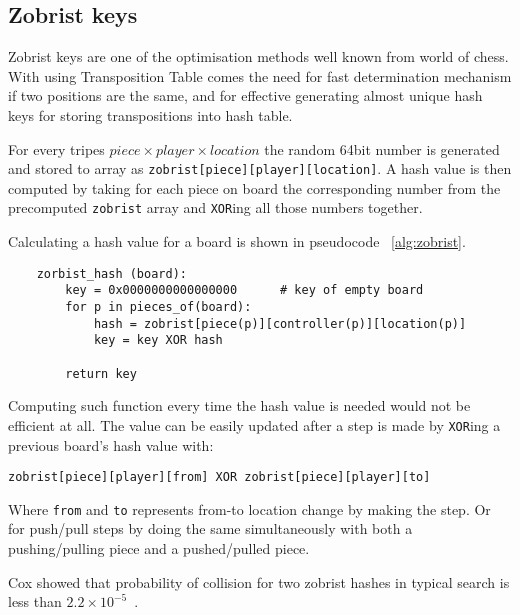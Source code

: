 	\subsection{Zobrist keys}
	Zobrist keys are one of the optimisation methods well known from world of
	chess. With using Transposition Table comes the need for fast determination
	mechanism if two positions are the same, and for effective generating
	almost unique hash keys for storing transpositions into hash table.
	
	For every tripes $piece\times player\times location$ the random 64bit
	number is generated and stored to array as
	\texttt{zobrist[piece][player][location]}. A hash value is then computed by
	taking for each piece on board the corresponding number from the
	precomputed \texttt{zobrist} array and \texttt{XOR}ing all those numbers
	together.

	Calculating a hash value for a board is shown in pseudocode
	~\ref{alg:zobrist}.

	\lstset{language=Python, caption=Computing hash value from zobrist keys, label=alg:zobrist}
	\begin{lstlisting}
    zorbist_hash (board):
        key = 0x0000000000000000      # key of empty board
        for p in pieces_of(board):
            hash = zobrist[piece(p)][controller(p)][location(p)]
            key = key XOR hash

        return key
    \end{lstlisting}

	Computing such function every time the hash value is needed would not be
	efficient at all. The value can be easily updated after a step is made by
	\texttt{XOR}ing a previous board's hash value with:
	\begin{center}
		\texttt{zobrist[piece][player][from] XOR zobrist[piece][player][to]}
	\end{center}
	Where \texttt{from} and \texttt{to} represents from-to location change by
	making the step. Or for push/pull steps by doing the same simultaneously
	with both a pushing/pulling piece and a pushed/pulled piece.

	Cox showed that probability of collision for two zobrist hashes in typical
	search is less than $2.2 \times 10^{-5}$~\cite{COX}.

% 
% 

